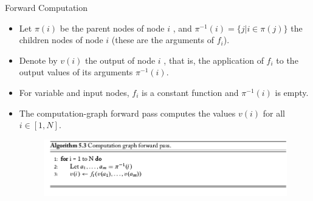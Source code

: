 \documentclass[handout]{beamer}
\begin{document}
\begin{frame}{Forward Computation}
\begin{scriptsize}
\begin{itemize}

\item Let $\pi(i)$ be the parent nodes of node $i$ , and $\pi^{-1}(i) = \{j| i \in \pi(j) \}$ the children nodes of node $i$ (these are the arguments of $f_i$).

\item Denote by $v(i)$  the output of node $i$ , that is, the application of $f_i$ to the output values of its arguments $\pi^{-1}(i)$. 

\item For variable and input nodes, $f_i$ is a constant function and $\pi^{-1}(i)$ is empty. 

\item The computation-graph forward pass computes the values $v(i)$ for all $i \in [1,N]$.

 \begin{figure}[htb]
	\centering
	 \includegraphics[scale=0.35]{pics/forwardPass.png}
\end{figure}

\end{itemize}
\end{scriptsize}
\end{frame}
\end{document}
